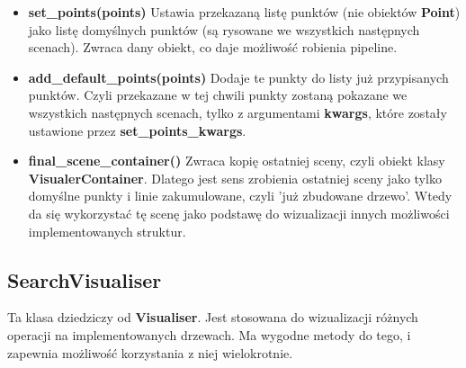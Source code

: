 \documentclass[a4paper, 12pt]{article}
\begin{document}
\begin{itemize}
          \item \textbf{set\_points(points)} \vspace{6pt}\newline
          \quad Ustawia przekazaną listę punktów (nie obiektów \textbf{Point}) jako listę domyślnych punktów (są rysowane we wszystkich następnych scenach). Zwraca dany obiekt, co daje możliwość robienia pipeline.
          \vspace{6pt}
          
          \item \textbf{add\_default\_points(points)} \vspace{6pt}\newline
          \quad Dodaje te punkty do listy już przypisanych punktów. Czyli przekazane w tej chwili punkty zostaną pokazane we wszystkich następnych scenach, tylko z argumentami \textbf{kwargs}, które zostały ustawione przez \textbf{set\_points\_kwargs}.
          \vspace{6pt}
          
          \item \textbf{final\_scene\_container()} \vspace{6pt}\newline
          \quad Zwraca kopię ostatniej sceny, czyli obiekt klasy \textbf{VisualerContainer}. Dlatego jest sens zrobienia ostatniej sceny jako tylko domyślne punkty i linie zakumulowane, czyli 'już zbudowane drzewo'. Wtedy da się wykorzystać tę scenę jako podstawę do wizualizacji innych możliwości implementowanych struktur.
          \vspace{6pt}
      \end{itemize}

    \subsection{SearchVisualiser}
      \quad Ta klasa dziedziczy od \textbf{Visualiser}. Jest stosowana do wizualizacji różnych operacji na implementowanych drzewach. Ma wygodne metody do tego, i zapewnia możliwość korzystania z niej wielokrotnie.
\end{document}
